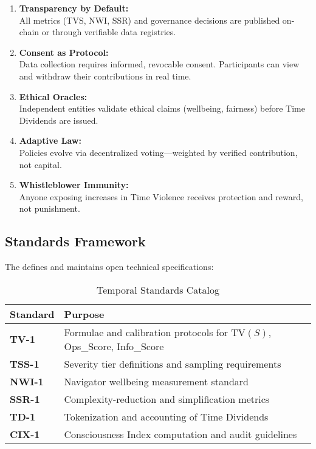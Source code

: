 \begin{enumerate}
    \item \textbf{Transparency by Default:}\\
    All metrics (TVS, NWI, SSR) and governance decisions are published on-chain or through verifiable data registries.
    
    \item \textbf{Consent as Protocol:}\\
    Data collection requires informed, revocable consent. Participants can view and withdraw their contributions in real time.
    
    \item \textbf{Ethical Oracles:}\\
    Independent entities validate ethical claims (wellbeing, fairness) before Time Dividends are issued.
    
    \item \textbf{Adaptive Law:}\\
    Policies evolve via decentralized voting—weighted by verified contribution, not capital.
    
    \item \textbf{Whistleblower Immunity:}\\
    Anyone exposing increases in Time Violence receives protection and reward, not punishment.
\end{enumerate}

\subsection{Standards Framework}
\label{sec:standards-framework}

The  defines and maintains open technical specifications:

\begin{table}[h]
\centering
\caption{Temporal Standards Catalog}
\label{tab:standards}
\begin{tabular}{p{2cm}p{10cm}}
\toprule
\textbf{Standard} & \textbf{Purpose} \\
\midrule
\textbf{TV-1} & Formulae and calibration protocols for TV$(S)$, Ops\_Score, Info\_Score \\
\textbf{TSS-1} & Severity tier definitions and sampling requirements \\
\textbf{NWI-1} & Navigator wellbeing measurement standard \\
\textbf{SSR-1} & Complexity-reduction and simplification metrics \\
\textbf{TD-1} & Tokenization and accounting of Time Dividends \\
\textbf{CIX-1} & Consciousness Index computation and audit guidelines \\
\bottomrule
\end{tabular}
\end{table}

